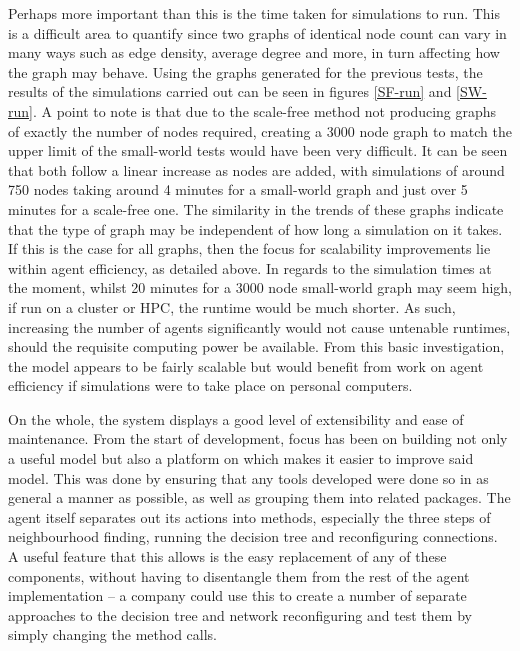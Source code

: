 \documentclass[]{report}
\begin{document}
Perhaps more important than this is the time taken for simulations to run. This is a difficult area to quantify since two graphs of identical node count can vary in many ways such as edge density, average degree and more, in turn affecting how the graph may behave. Using the graphs generated for the previous tests, the results of the simulations carried out can be seen in figures \ref{SF-run} and \ref{SW-run}. A point to note is that due to the scale-free method not producing graphs of exactly the number of nodes required, creating a 3000 node graph to match the upper limit of the small-world tests would have been very difficult. It can be seen that both follow a linear increase as nodes are added, with simulations of around 750 nodes taking around 4 minutes for a small-world graph and just over 5 minutes for a scale-free one. The similarity in the trends of these graphs indicate that the type of graph may be independent of how long a simulation on it takes. If this is the case for all graphs, then the focus for scalability improvements lie within agent efficiency, as detailed above. In regards to the simulation times at the moment, whilst 20 minutes for a 3000 node small-world graph may seem high, if run on a cluster or HPC, the runtime would be much shorter. As such, increasing the number of agents significantly would not cause untenable runtimes, should the requisite computing power be available. From this basic investigation, the model appears to be fairly scalable but would benefit from work on agent efficiency if simulations were to take place on personal computers.

On the whole, the system displays a good level of extensibility and ease of maintenance. From the start of development, focus has been on building not only a useful model but also a platform on which makes it easier to improve said model. This was done by ensuring that any tools developed were done so in as general a manner as possible, as well as grouping them into related packages. The agent itself separates out its actions into methods, especially the three steps of neighbourhood finding, running the decision tree and reconfiguring connections. A useful feature that this allows is the easy replacement of any of these components, without having to disentangle them from the rest of the agent implementation – a company could use this to create a number of separate approaches to the decision tree and network reconfiguring and test them by simply changing the method calls.
\end{document}
